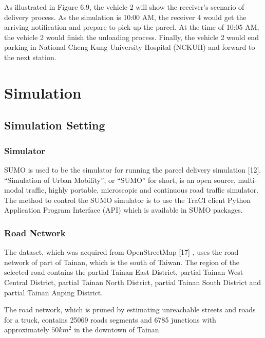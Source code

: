 \documentclass[12pt]{ksthesis}
\begin{document}
\begin{thesis}
{As illustrated in Figure 6.9, the vehicle 2 will show the receiver’s scenario of delivery process. As the simulation is 10:00 AM, the receiver 4 would get the arriving notification and prepare to pick up the parcel. At the time of 10:05 AM, the vehicle 2 would finish the unloading process. Finally, the vehicle 2 would end parking in National Cheng Kung University Hospital (NCKUH) and forward to the next station.








\chapter{Simulation}\label{Chap:Simulation}

\section{Simulation Setting}

\subsection{Simulator}
SUMO is used to be the simulator for running the parcel delivery simulation [12]. “Simulation of Urban Mobility”, or “SUMO” for short, is an open source, multi-modal traffic, highly portable, microscopic and continuous road traffic simulator. The method to control the SUMO simulator is to use the TraCI client Python Application Program Interface (API) which is available in SUMO packages.

\subsection{Road Network}

The dataset, which was acquired from OpenStreetMap [17] \cite{Haklay2008} , uses the road network of part of Tainan, which is the south of Taiwan. The region of the selected road contains the partial Tainan East District, partial Tainan West Central District, partial Tainan North District, partial Tainan South District and partial Tainan Anping District.

The road network, which is pruned by estimating unreachable streets and roads for a truck, contains 25069 roads segments and 6785 junctions with approximately $50km^{2}$ in the downtown of Tainan.

}
\end{thesis}
\end{document}
